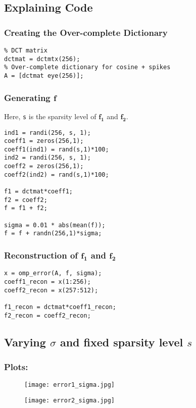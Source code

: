 \documentclass[fleqn, 11pt]{article}
\begin{document}
\bigskip

\subsection*{Explaining Code}
\subsubsection*{Creating the Over-complete Dictionary}
\begin{verbatim}
% DCT matrix
dctmat = dctmtx(256);
% Over-complete dictionary for cosine + spikes
A = [dctmat eye(256)];
\end{verbatim}

\subsubsection*{Generating $\boldsymbol{f}$}
Here, \texttt{s} is the sparsity level of $\boldsymbol{f_1}$ and $\boldsymbol{f_2}$.
\begin{verbatim}
ind1 = randi(256, s, 1);
coeff1 = zeros(256,1);
coeff1(ind1) = rand(s,1)*100;
ind2 = randi(256, s, 1);
coeff2 = zeros(256,1);
coeff2(ind2) = rand(s,1)*100;

f1 = dctmat*coeff1;
f2 = coeff2;
f = f1 + f2;

sigma = 0.01 * abs(mean(f));
f = f + randn(256,1)*sigma;
\end{verbatim}

\subsubsection*{Reconstruction of $\boldsymbol{f_1}$ and $\boldsymbol{f_2}$}
\begin{verbatim}
x = omp_error(A, f, sigma);
coeff1_recon = x(1:256);
coeff2_recon = x(257:512);

f1_recon = dctmat*coeff1_recon;
f2_recon = coeff2_recon;
\end{verbatim}

\bigskip

\subsection*{Varying $\sigma$ and fixed sparsity level $s$}
\subsubsection*{Plots:}
\begin{figure}[H]
    \centering
    \begin{floatrow}
      {\texttt{[image: error1\_sigma.jpg]}}
      
      {\texttt{[image: error2\_sigma.jpg]}}
    \end{floatrow}
\end{figure}
\end{document}
